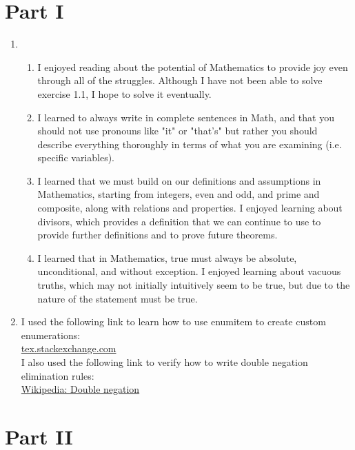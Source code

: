 \documentclass{article}
\begin{document}
\section*{Part I}

\begin{enumerate}[1.]
    \item
    \begin{enumerate}[label=(Section \arabic*), leftmargin=*]
        \item I enjoyed reading about the potential of Mathematics to provide joy even through all of the struggles. Although I have not been able to solve exercise 1.1, I hope to solve it eventually.
        \item I learned to always write in complete sentences in Math, and that you should not use pronouns like "it" or "that's" but rather you should describe everything thoroughly in terms of what you are examining (i.e. specific variables).
        \item I learned that we must build on our definitions and assumptions in Mathematics, starting from integers, even and odd, and prime and composite, along with relations and properties. I enjoyed learning about divisors, which provides a definition that we can continue to use to provide further definitions and to prove future theorems.
        \item I learned that in Mathematics, true must always be absolute, unconditional, and without exception. I enjoyed learning about vacuous truths, which may not initially intuitively seem to be true, but due to the nature of the statement must be true.
    \end{enumerate}
    \item I used the following link to learn how to use enumitem to create custom enumerations:\\
          \href {https://tex.stackexchange.com/questions/600622/custom-enumerate-environment}{tex.stackexchange.com}\\
          I also used the following link to verify how to write double negation elimination rules:\\
          \href {https://en.wikipedia.org/wiki/Double_negation}{Wikipedia: Double negation}
\end{enumerate}

\section*{Part II}
\end{document}

